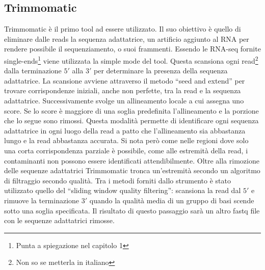   	\subsection{Trimmomatic}
	Trimmomatic \cite{trimmomatic} \`e il primo tool ad essere utilizzato.
	Il suo obiettivo \`e quello di eliminare dalle reads la sequenza adattatrice, un artificio aggiunto al RNA per rendere possibile il sequenziamento, o suoi frammenti.
	Essendo le RNA-seq fornite single-ends\footnote{Punta a spiegazione nel capitolo 1} viene utilizzata la simple mode del tool.
	Questa scansiona ogni read\footnote{Non so se metterla in italiano} dalla terminazione $5'$ alla $3'$ per determinare la presenza della sequenza adattatrice.
        La scansione avviene attraverso il metodo ``seed and extend'' per trovare corrispondenze iniziali, anche non perfette, tra la read e la sequenza adattatrice.
	Successivamente svolge un allineamento locale a cui assegna uno score.
        Se lo score \`e maggiore di una soglia predefinita l'allineamento e la porzione che lo segue sono rimossi.
	Questa modalit\`a permette di identificare ogni sequenza adattatrice in ogni luogo della read a patto che l'allineamento sia abbastanza lungo e la read abbastanza accurata.
	Si nota per\`o come nelle regioni dove solo una corta corrispondenza parziale \`e possibile, come alle estremit\`a della read, i contaminanti non possono essere identificati attendibilmente.
	Oltre alla rimozione delle sequenze adattatrici Trimmomatic tronca un'estremit\`a secondo un algoritmo di filtraggio secondo qualit\`a.
	Tra i metodi forniti dallo strumento \`e stato utilizzato quello del ``sliding window quality filtering'':
	scansiona la read dal $5'$ e rimuove la terminazione $3'$ quando la qualit\`a media di un gruppo di basi scende sotto una soglia specificata.
	Il risultato di questo passaggio sar\`a un altro fastq file con le sequenze adattatrici rimosse.

